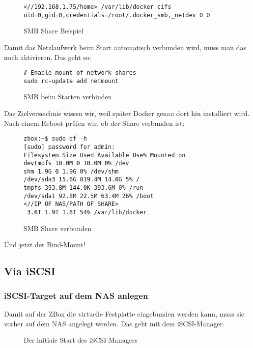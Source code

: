 \documentclass[12pt,a4paper,ngerman]{article}
\newcommand{\jpaimg}[2]{\begin{figure}[H]\centering\fbox{\texttt{[image: \#1]}}\caption{#2}\label{fig:#2}\end{figure}}
\newcommand{\jpacaption}[1]{\caption{#1}\label{fig:#1}}
\begin{document}
\begin{figure}[H]
    \begin{lstlisting}
<//192.168.1.75/home> /var/lib/docker cifs uid=0,gid=0,credentials=/root/.docker_smb,_netdev 0 0
    \end{lstlisting}
    \jpacaption{SMB Share Beispiel}
\end{figure}

Damit das Netzlaufwerk beim Start automatisch verbunden wird, muss man das noch
aktivieren. Das geht so:

\begin{figure}[H]
    \begin{lstlisting}
# Enable mount of network shares
sudo rc-update add netmount
    \end{lstlisting}
    \jpacaption{SMB beim Starten verbinden}
\end{figure}

Das Zielverzeichnis wissen wir, weil später Docker genau dort hin installiert
wird. Nach einem Reboot prüfen wir, ob der Share verbunden ist:

\begin{figure}[H]
    \begin{lstlisting}
zbox:~$ sudo df -h
[sudo] password for admin:
Filesystem Size Used Available Use% Mounted on
devtmpfs 10.0M 0 10.0M 0% /dev
shm 1.9G 0 1.9G 0% /dev/shm
/dev/sda3 15.6G 819.4M 14.0G 5% /
tmpfs 393.8M 144.0K 393.6M 0% /run
/dev/sda1 92.8M 22.5M 63.4M 26% /boot
<//IP OF NAS/PATH OF SHARE>
 3.6T 1.9T 1.6T 54% /var/lib/docker
\end{lstlisting}
    \jpacaption{SMB Share verbunden}
\end{figure}

Und jetzt der \href{https://unix.stackexchange.com/questions/198590/what-is-a-bind-mount}{Bind-Mount}!

\subsection{Via iSCSI}

\subsubsection{iSCSI-Target auf dem NAS anlegen}
Damit auf der ZBox die virtuelle Festplatte eingebunden werden kann, muss sie
vorher auf dem NAS angelegt werden. Das geht mit dem iSCSI-Manager.

\jpaimg{./images/DSM-ISCSI-01.png}{Der initiale Start des iSCSI-Managers}
\end{document}
